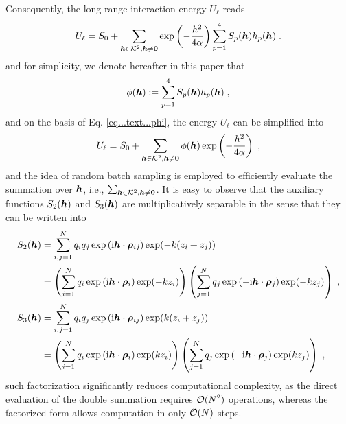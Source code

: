 Consequently, the long-range interaction energy   $U_\ell$ reads
\begin{equation}\label{eq...text...Energy}
U_\ell =    S_0+ \sum_{\boldsymbol{h}\in\mathcal{K}^2,\boldsymbol{h}\neq\bm{0}} \exp\left(-\frac{h^2}{4\alpha}\right)\sum_{p=1}^4S_p(\boldsymbol{h})h_p(\boldsymbol{h})\;.
\end{equation}
and for simplicity, we denote hereafter in this paper that 
\begin{equation}\label{eq...text...phi}
    \phi(\boldsymbol{h}):=\sum_{p=1}^4S_p(\boldsymbol{h})h_p(\boldsymbol{h})\;,
\end{equation}
and on the basis of Eq. \eqref{eq...text...phi}, the   energy   $U_\ell$ can be simplified into 
\begin{equation} \label{eq...text...EnergywithPhi}
U_\ell =    S_0+ \sum_{\boldsymbol{h}\in\mathcal{K}^2,\boldsymbol{h}\neq\bm{0}} \phi(\boldsymbol{h})\exp\left(-\frac{h^2}{4\alpha}\right) \;,
\end{equation}
and the idea of random batch sampling is employed to efficiently evaluate the summation over   $\boldsymbol{h}$, i.e., $\sum_{\boldsymbol{h}\in\mathcal{K}^2,\boldsymbol{h}\neq\bm{0}}$. 
It is easy to observe that  the  auxiliary functions  $S_2(\boldsymbol{h})$ and $S_3(\boldsymbol{h})$ are multiplicatively separable  in the sense that  they can be written into
\begin{align*}
S_2(\boldsymbol{h})&=\sum_{i,j=1}^Nq_iq_j  \exp{(\mathrm{i} \boldsymbol{h} \cdot \boldsymbol{\rho}_{ij})}\exp(-k(z_i+z_j))\\
&=\left(\sum_{i=1}^Nq_i\exp{(\mathrm{i} \boldsymbol{h} \cdot \boldsymbol{\rho}_{i})}\exp(-kz_i)\right)\left(\sum_{j=1}^Nq_j\exp{(-\mathrm{i} \boldsymbol{h} \cdot \boldsymbol{\rho}_{j})}\exp(-kz_j)\right)\;,\\
S_3(\boldsymbol{h})&=\sum_{i,j=1}^Nq_iq_j  \exp{(\mathrm{i} \boldsymbol{h} \cdot \boldsymbol{\rho}_{ij})}\exp(k(z_i+z_j))\\
&=\left(\sum_{i=1}^Nq_i  \exp{(\mathrm{i} \boldsymbol{h} \cdot \boldsymbol{\rho}_{i})}\exp(kz_i)\right)\left(\sum_{j=1}^Nq_j  \exp{(-\mathrm{i} \boldsymbol{h} \cdot \boldsymbol{\rho}_{j})}\exp(kz_j)\right)\;,
\end{align*}
such factorization significantly reduces computational complexity, as the direct evaluation of the double summation requires 
$\mathcal{O}(N^2)$ operations, whereas the factorized form allows computation in only 
$\mathcal{O}(N)$ steps.

